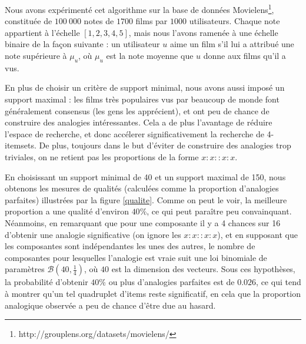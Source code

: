 Nous avons expérimenté cet algorithme sur la base de données
Movielens\footnote{http://grouplens.org/datasets/movielens/},
constituée de $100~000$ notes de $1700$ films par $1000$ utilisateurs. Chaque
note appartient à l'échelle $[1, 2, 3, 4, 5]$, mais nous l'avons ramenée à une
échelle binaire de la façon suivante : un utilisateur $u$ aime un film s'il lui
a attribué une note supérieure à $\mu_u$, où $\mu_u$ est la note moyenne que
$u$ donne aux films qu'il a vus.

En plus de choisir un critère de support minimal, nous avons aussi imposé un
support maximal : les films très populaires vus par beaucoup de monde font
généralement consensus (les gens les apprécient), et ont peu de chance de
construire des analogies intéressantes. Cela a de plus l'avantage de réduire
l'espace de recherche, et donc accélerer significativement la recherche de
4-itemsets. De plus, toujours dans le but d'éviter de construire des analogies
trop triviales, on ne retient pas les proportions de la forme $x:x::x:x$.

En choisissant un support minimal de 40 et un support maximal de 150, nous
obtenons les mesures de qualités (calculées comme la proportion d'analogies 
parfaites) illustrées par la figure \ref{qualite}. Comme on peut le voir, la
meilleure proportion a une qualité d'environ $40$\%, ce qui peut paraître peu
convainquant. Néanmoins, en remarquant que pour une composante il y a 4 chances
sur 16 d'obtenir une analogie significative (on ignore les $x:x::x:x$), et en supposant que les composantes sont
indépendantes les unes des autres, le nombre de composantes pour lesquelles
l'analogie est vraie suit une loi binomiale de paramètres $\mathcal{B}(40,
\frac{1}{4})$, où $40$ est la dimension des vecteurs. Sous ces hypothèses, la
probabilité d'obtenir $40$\% ou plus d'analogies parfaites est de $0.026$, ce qui
tend à montrer qu'un tel quadruplet d'items reste significatif, en cela que la
proportion analogique observée a peu de chance d'être due au hasard.

